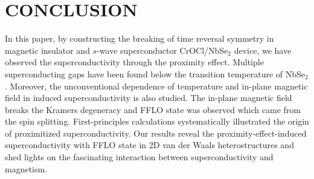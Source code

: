 \documentclass[%
 reprint,
superscriptaddress,
 amsmath,amssymb,
 aps,
]{revtex4-2}
\begin{document}


\section{CONCLUSION}
In this paper, by constructing the breaking of time reversal symmetry in magnetic insulator and $s$-wave superconductor CrOCl/NbSe$_2$ device, we have observed the superconductivity through the proximity effect. Multiple superconducting gaps have been found below the transition temperature of NbSe$_2$. Moreover, the unconventional dependence of temperature and in-plane magnetic field in induced superconductivity is also studied. The in-plane magnetic field breaks the Kramers degeneracy and FFLO state was observed which came from the spin splitting. First-principles calculations systematically illustrated the origin of proximitized superconductivity. Our results reveal the proximity-effect-induced  superconductivity with FFLO state in 2D van der Waals heterostructures and shed lights on the fascinating interaction between superconductivity and magnetism.
\end{document}
